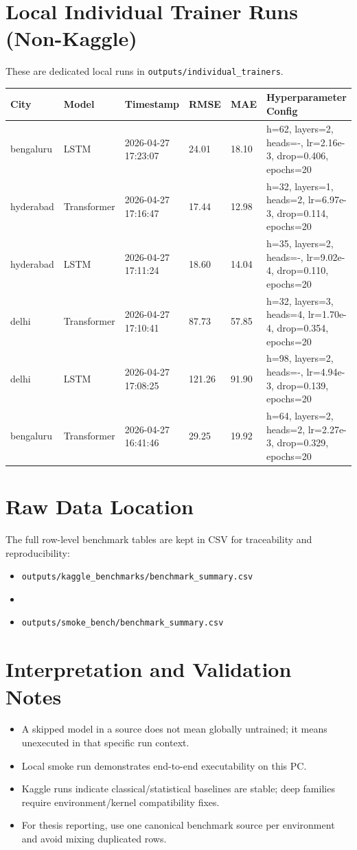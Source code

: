 \documentclass[11pt,a4paper,oneside]{book}
\begin{document}
\chapter{Local Individual Trainer Runs (Non-Kaggle)}
These are dedicated local runs in \texttt{outputs/individual\_trainers}.
\footnotesize
\begin{longtable}{@{}L{1.4cm}L{1.5cm}L{2.6cm}L{0.9cm}L{0.9cm}L{6.5cm}@{}}
\toprule
City & Model & Timestamp & RMSE & MAE & Hyperparameter Config \\
\midrule
bengaluru & LSTM & 2026-04-27 17:23:07 & 24.01 & 18.10 & h=62, layers=2, heads=-, lr=2.16e-3, drop=0.406, epochs=20 \\
hyderabad & Transformer & 2026-04-27 17:16:47 & 17.44 & 12.98 & h=32, layers=1, heads=2, lr=6.97e-3, drop=0.114, epochs=20 \\
hyderabad & LSTM & 2026-04-27 17:11:24 & 18.60 & 14.04 & h=35, layers=2, heads=-, lr=9.02e-4, drop=0.110, epochs=20 \\
delhi & Transformer & 2026-04-27 17:10:41 & 87.73 & 57.85 & h=32, layers=3, heads=4, lr=1.70e-4, drop=0.354, epochs=20 \\
delhi & LSTM & 2026-04-27 17:08:25 & 121.26 & 91.90 & h=98, layers=2, heads=-, lr=4.94e-3, drop=0.139, epochs=20 \\
bengaluru & Transformer & 2026-04-27 16:41:46 & 29.25 & 19.92 & h=64, layers=2, heads=2, lr=2.27e-3, drop=0.329, epochs=20 \\
\bottomrule
\end{longtable}
\normalsize

\chapter{Raw Data Location}
The full row-level benchmark tables are kept in CSV for traceability and reproducibility:
\begin{itemize}
  \item \texttt{outputs/kaggle\_benchmarks/benchmark\_summary.csv}
  \item {}
  \item \texttt{outputs/smoke\_bench/benchmark\_summary.csv}
\end{itemize}

\chapter{Interpretation and Validation Notes}
\begin{itemize}
  \item A skipped model in a source does not mean globally untrained; it means unexecuted in that specific run context.
  \item Local smoke run demonstrates end-to-end executability on this PC.
  \item Kaggle runs indicate classical/statistical baselines are stable; deep families require environment/kernel compatibility fixes.
  \item For thesis reporting, use one canonical benchmark source per environment and avoid mixing duplicated rows.
\end{itemize}
\end{document}
